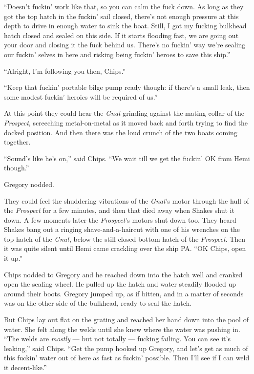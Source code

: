 \documentclass[
]{scrbook}
\begin{document}
``Doesn't fuckin' work like that, so you can calm the fuck down. As long
as they got the top hatch in the fuckin' sail closed, there's not enough
pressure at this depth to drive in enough water to sink the boat. Still,
I got my fucking bulkhead hatch closed and sealed on this side. If it
starts flooding fast, we are going out your door and closing it the fuck
behind us. There's no fuckin' way we're sealing our fuckin' selves in
here and risking being fuckin' heroes to save this ship.''

``Alright, I'm following you then, Chips.''

``Keep that fuckin' portable bilge pump ready though: if there's a small
leak, then some modest fuckin' heroics will be required of us.''

At this point they could hear the \emph{Gnat} grinding against the
mating collar of the \emph{Prospect}, screeching metal-on-metal as it
moved back and forth trying to find the docked position. And then there
was the loud crunch of the two boats coming together.

``Sound's like he's on,'' said Chips. ``We wait till we get the fuckin'
OK from Hemi though.''

Gregory nodded.

They could feel the shuddering vibrations of the \emph{Gnat}'s motor
through the hull of the \emph{Prospect} for a few minutes, and then that
died away when Shakes shut it down. A few moments later the
\emph{Prospect}'s motors shut down too. They heard Shakes bang out a
ringing shave-and-a-haircut with one of his wrenches on the top hatch of
the \emph{Gnat}, below the still-closed bottom hatch of the
\emph{Prospect}. Then it was quite silent until Hemi came crackling over
the ship PA. ``OK Chips, open it up.''

Chips nodded to Gregory and he reached down into the hatch well and
cranked open the sealing wheel. He pulled up the hatch and water
steadily flooded up around their boots. Gregory jumped up, as if bitten,
and in a matter of seconds was on the other side of the bulkhead, ready
to seal the hatch.

But Chips lay out flat on the grating and reached her hand down into the
pool of water. She felt along the welds until she knew where the water
was pushing in. ``The welds are \emph{mostly} --- but not totally ---
fucking failing. You can see it's leaking,'' said Chips. ``Get the pump
hooked up Gregory, and let's get as much of this fuckin' water out of
here as fast as fuckin' possible. Then I'll see if I can weld it
decent-like.''
\end{document}
